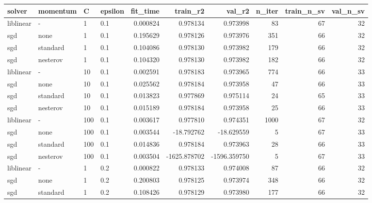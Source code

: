 \begin{tabular}{llllrrrrrr}
\toprule
   solver & momentum &   C & epsilon &  fit\_time &     train\_r2 &       val\_r2 &  n\_iter &  train\_n\_sv &  val\_n\_sv \\
\midrule
liblinear &        - &   1 &     0.1 &  0.000824 &     0.978134 &     0.973998 &      83 &          67 &        32 \\
      sgd &     none &   1 &     0.1 &  0.195629 &     0.978126 &     0.973976 &     351 &          66 &        32 \\
      sgd & standard &   1 &     0.1 &  0.104086 &     0.978130 &     0.973982 &     179 &          66 &        32 \\
      sgd & nesterov &   1 &     0.1 &  0.104320 &     0.978130 &     0.973982 &     182 &          66 &        32 \\
liblinear &        - &  10 &     0.1 &  0.002591 &     0.978183 &     0.973965 &     774 &          66 &        33 \\
      sgd &     none &  10 &     0.1 &  0.025562 &     0.978184 &     0.973958 &      47 &          66 &        33 \\
      sgd & standard &  10 &     0.1 &  0.013823 &     0.977869 &     0.975114 &      24 &          65 &        33 \\
      sgd & nesterov &  10 &     0.1 &  0.015189 &     0.978184 &     0.973958 &      25 &          66 &        33 \\
liblinear &        - & 100 &     0.1 &  0.003617 &     0.977810 &     0.974351 &    1000 &          67 &        32 \\
      sgd &     none & 100 &     0.1 &  0.003544 &   -18.792762 &   -18.629559 &       5 &          67 &        33 \\
      sgd & standard & 100 &     0.1 &  0.014836 &     0.978184 &     0.973963 &      28 &          66 &        33 \\
      sgd & nesterov & 100 &     0.1 &  0.003504 & -1625.878702 & -1596.359750 &       5 &          67 &        33 \\
liblinear &        - &   1 &     0.2 &  0.000822 &     0.978133 &     0.974008 &      87 &          66 &        32 \\
      sgd &     none &   1 &     0.2 &  0.200803 &     0.978125 &     0.973974 &     348 &          66 &        32 \\
      sgd & standard &   1 &     0.2 &  0.108426 &     0.978129 &     0.973980 &     177 &          66 &        32 \\

\end{tabular}

